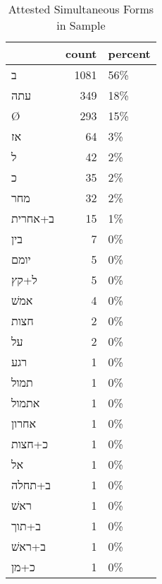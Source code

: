 \begin{table}[htbp!]
\centering
\caption{Attested Simultaneous Forms in Sample}
\label{table:sim_front}
\begin{tabular}{lrl}
\toprule
{} &  count & percent \\
\midrule
\texthebrew{ב}       &   1081 &     56\% \\
\texthebrew{עתה}     &    349 &     18\% \\
\texthebrew{Ø}       &    293 &     15\% \\
\texthebrew{אז}      &     64 &      3\% \\
\texthebrew{ל}       &     42 &      2\% \\
\texthebrew{כ}       &     35 &      2\% \\
\texthebrew{מחר}     &     32 &      2\% \\
\texthebrew{ב+אחרית} &     15 &      1\% \\
\texthebrew{בין}     &      7 &      0\% \\
\texthebrew{יומם}    &      5 &      0\% \\
\texthebrew{ל+קץ}    &      5 &      0\% \\
\texthebrew{אמשׁ}    &      4 &      0\% \\
\texthebrew{חצות}    &      2 &      0\% \\
\texthebrew{על}      &      2 &      0\% \\
\texthebrew{רגע}     &      1 &      0\% \\
\texthebrew{תמול}    &      1 &      0\% \\
\texthebrew{אתמול}   &      1 &      0\% \\
\texthebrew{אחרון}   &      1 &      0\% \\
\texthebrew{כ+חצות}  &      1 &      0\% \\
\texthebrew{אל}      &      1 &      0\% \\
\texthebrew{ב+תחלה}  &      1 &      0\% \\
\texthebrew{ראשׁ}    &      1 &      0\% \\
\texthebrew{ב+תוך}   &      1 &      0\% \\
\texthebrew{ב+ראשׁ}  &      1 &      0\% \\
\texthebrew{כ+מן}    &      1 &      0\% \\
\bottomrule
\end{tabular}
\end{table}

